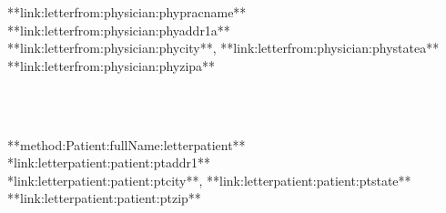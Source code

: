 \documentclass{article}
\begin{document}
\begin{landscape}

\Large

\flushleft
\leftskip=3.2in {**link:letterfrom:physician:phypracname**} \\
\leftskip=3.2in **link:letterfrom:physician:phyaddr1a** \\
\leftskip=3.2in **link:letterfrom:physician:phycity**, **link:letterfrom:physician:phystatea** **link:letterfrom:physician:phyzipa**

\bigskip
\ \\
\bigskip
\ \\
\bigskip

\leftskip=6.5in \Large {**method:Patient:fullName:letterpatient**} \\
\leftskip=6.5in \Large **link:letterpatient:patient:ptaddr1** \\
\leftskip=6.5in \Large **link:letterpatient:patient:ptcity**, **link:letterpatient:patient:ptstate** **link:letterpatient:patient:ptzip**

\end{landscape}
\end{document}
